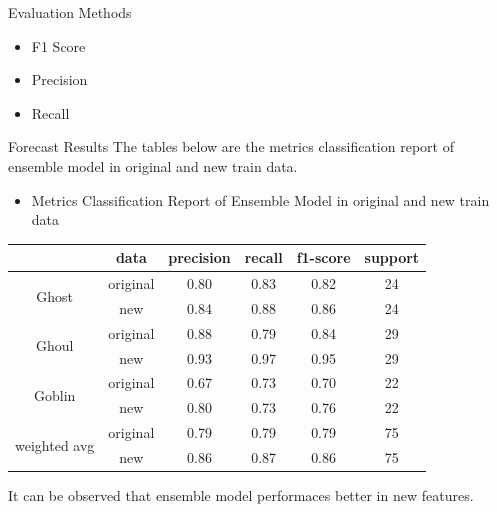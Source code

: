 \documentclass[
 size=14pt,
 paper=smartboard,  %
 mode=present, 		%
 display=slides, 	%
 style=tuliplab,  	%
 pauseslide,
 fleqn,leqno]{powerdot}
\begin{document}
\begin{slide}{Evaluation Methods}
	\begin{center}
		\begin{itemize}
			\item F1 Score
			\item Precision
			\item Recall
		\end{itemize}
	\end{center}
	
\end{slide}
\begin{slide}{Forecast Results}
The tables below are 
the metrics classification report 
of ensemble model in 
original and new train data.
\begin{itemize}
	\item Metrics Classification Report of Ensemble Model in original and new train data
\end{itemize}
\begin{center}
	\begin{tabular}{cccccc}
		\hline
		& data &precision & recall & f1-score & support\\
		\hline
		\multirow{2}{*}{Ghost}  & original & 0.80   &   0.83  & 0.82 & 24\\
		& new &0.84  &  0.88  & 0.86 &  24\\
		\hline
		\multirow{2}{*}{Ghoul}  & original & 0.88  &  0.79  &   0.84   &   29\\
		& new & 0.93  & 0.97 &  0.95 &  29\\
		\hline
		\multirow{2}{*}{Goblin}  & original & 0.67  &  0.73 &  0.70  &   22\\
		& new  &  0.80 &  0.73  & 0.76  &  22\\
		\hline  
		\multirow{2}{*}{weighted avg}  & original & 0.79  &  0.79 &  0.79  &  75\\
		& new  &  0.86 & 0.87  &  0.86  &  75\\
		\hline 
	\end{tabular}
\end{center}
It can be observed that ensemble model
performaces better in new features.

\end{slide}


\end{document}
